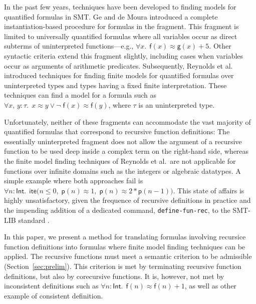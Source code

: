\documentclass[runningheads,a4paper]{llncs}
\newcommand{\con}[1]{\mathsf{#1}}
\let\oldneg=\neg
\def\neg{\oldneg\;}
\let\oldvee=\vee
\def\vee{\mathrel{\oldvee}}
\newcommand{\teq}{\approx}
\newcommand{\typeint}{\ty{Int}}
\newcommand\ty[1]{\con{#1}}
\newcommand{\lite}{\con{ite}}
\newcommand{\vthinspace}{\kern+0.083333em}
\newcommand{\typ}[1]{^{\vthinspace #1}}
\begin{document}
In the past few years, techniques have been developed to finding models for
quantified formulas in SMT.
Ge and de Moura \cite{GeDeM-CAV-09} introduced a complete instantiation-based
procedure for formulas in the  fragment.
This fragment is limited to universally quantified formulas where all
variables occur as direct subterms of uninterpreted
functions---e.g., $\forall x%
.\;\, \con{f}( x )
\teq \con{g}( x ) + 5$.
Other syntactic criteria extend
this fragment slightly, including cases when variables occur as arguments of
arithmetic predicates. Subsequently, Reynolds et al.\
\cite{ReyEtAl-1-RR-13,reynolds-et-al-2013} introduced techniques for finding finite
models for quantified
formulas over uninterpreted types and types having a fixed finite
interpretation. %
These techniques can
find a model for a formula such as $\forall x,\, y : \tau.\;\, x \teq
y \vee \allowbreak \neg \con{f}( x ) \teq \con{f}( y )$, where $\tau$ is an uninterpreted type.

Unfortunately, neither of these fragments can accommodate the vast majority of
quantified formulas that correspond to recursive function definitions: The
essentially uninterpreted fragment does not allow the argument of a
recursive function to be used deep inside a complex term on the right-hand side,
whereas the finite model finding techniques of Reynolds et al.\ are not
applicable for functions over infinite domains such as the integers or
algebraic datatypes. A simple example where both approaches fail is
$\forall n : {\typeint}.\;\, \lite\bigl(
n \leq 0,\allowbreak\; \con{p}( n ) \teq 1,\allowbreak\; \con{p}( n ) \teq 2 * \con{p}( n - 1 ) \bigr)$.
This state of affairs is highly unsatisfactory, given the frequence of
recursive definitions in practice and the impending addition of a dedicated
command, \texttt{define-fun-rec}, to the SMT-LIB standard \cite{smtlib25}.

In this paper, we present a method for translating formulas involving recursice function
definitions into formulas where finite model finding techniques can be applied.
The recursive functions must meet a semantic criterion to be admissible
(Section~\ref{sec:prelim}). This criterion is met by terminating recursive
function definitions, but also by
 corecursive functions. It is, however, not met by inconsistent
definitions such as $\forall n : {\typeint}.\;\, \con{f}(n) \teq \con{f}(n) +
1$, %
as well as other example of consistent definition.
\end{document}
